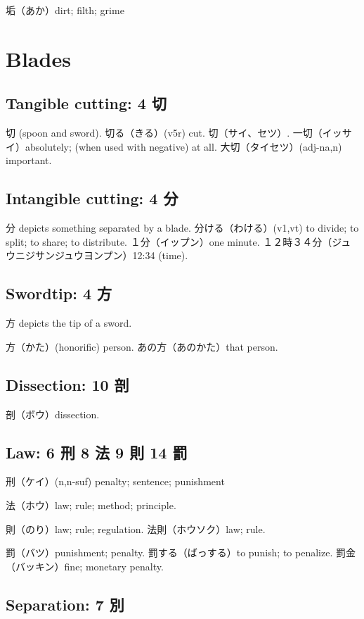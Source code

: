 垢（あか）dirt; filth; grime

\section{Blades}

\subsection{Tangible cutting: 4 切}

切 (spoon and sword).
切る（きる）(v5r) cut.
切（サイ、セツ）.
一切（イッサイ）absolutely; (when used with negative) at all.
大切（タイセツ）(adj-na,n) important.

\subsection{Intangible cutting: 4 分}

分 depicts something separated by a blade.
分ける（わける）(v1,vt) to divide; to split; to share; to distribute.
１分（イップン）one minute.
１２時３４分（ジュウニジサンジュウヨンプン）12:34 (time).

\subsection{Swordtip: 4 方}

方 depicts the tip of a sword.

方（かた）(honorific) person.
あの方（あのかた）that person.

\subsection{Dissection: 10 剖}

剖（ボウ）dissection.

\subsection{Law: 6 刑 8 法 9 則 14 罰}

刑（ケイ）(n,n-suf) penalty; sentence; punishment

法（ホウ）law; rule; method; principle.

則（のり）law; rule; regulation.
法則（ホウソク）law; rule.

罰（バツ）punishment; penalty.
罰する（ばっする）to punish; to penalize.
罰金（バッキン）fine; monetary penalty.

\subsection{Separation: 7 別}

